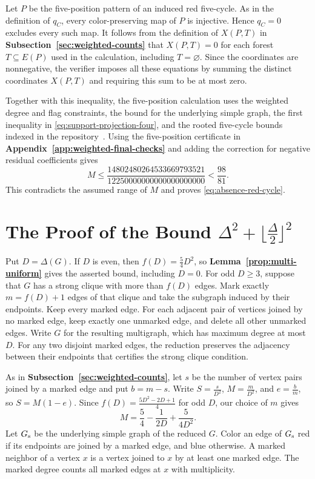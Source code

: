 \documentclass[preprint,11pt,numbers]{elsarticle-arxiv}
\numberwithin{equation}{section}
\theoremstyle{definition}
\begin{document}
Let $P$ be the five-position pattern of an induced red five-cycle.
As in the definition of $q_C$, every color-preserving map of $P$ is injective. Hence $q_C=0$ excludes every such map. It follows from
the definition of $X(P,T)$ in
\textbf{Subsection~\ref{sec:weighted-counts}} that $X(P,T)=0$ for
each forest $T\subseteq E(P)$ used in the calculation, including
$T=\varnothing$. Since the coordinates are nonnegative, the verifier
imposes all these equations by summing the distinct coordinates
$X(P,T)$ and requiring this sum to be at most zero.

Together with this inequality, the five-position calculation uses
the weighted degree and flag constraints, the bound for the underlying simple graph,
the first inequality in \eqref{eq:support-projection-four}, and the
rooted five-cycle bounds indexed in the repository~\cite{FGSTCode}.
Using the five-position certificate in
\textbf{Appendix~\ref{app:weighted-final-checks}} and adding the correction for
negative residual coefficients gives
\[
 M\leq\frac{14802480264533669793521}{12250000000000000000000}
   <\frac{98}{81}.
\]
This contradicts the assumed range of $M$ and proves
\eqref{eq:absence-red-cycle}.
\relax\space%
\relax\space%
\section{The Proof of the Bound \texorpdfstring{$\Delta^2+\lfloor\frac{\Delta}{2}\rfloor^2$}{Delta squared plus floor(Delta/2) squared}}\label{sec:exact}\label{sec:multi-odd}

Put $D=\Delta(G)$. If $D$ is even, then $f(D)=\frac{5}{4}D^2$, so
\textbf{Lemma~\ref{prop:multi-uniform}} gives the asserted bound,
including $D=0$. For odd $D\geq3$, suppose that $G$ has a strong
clique with more than $f(D)$ edges. Mark exactly $m=f(D)+1$ edges of
that clique and take the subgraph induced by their endpoints. Keep
every marked edge. For each adjacent pair of vertices joined by no
marked edge, keep exactly one unmarked edge, and delete all other
unmarked edges. Write $G$ for the resulting multigraph, which has
maximum degree at most $D$. For any two disjoint marked edges, the
reduction preserves the adjacency between their endpoints that
certifies the strong clique condition.

As in \textbf{Subsection~\ref{sec:weighted-counts}}, let $s$ be the
number of vertex pairs joined by a marked edge and put $b=m-s$. Write
$S=\frac{s}{D^2}$, $M=\frac{m}{D^2}$, and $e=\frac{b}{m}$, so
$S=M(1-e)$. Since $f(D)=\frac{5D^2-2D+1}{4}$ for odd $D$, our
choice of $m$ gives
\begin{equation}\label{eq:multi-mass}
 M=\frac{5}{4}-\frac{1}{2D}+\frac{5}{4D^2}.
\end{equation}
Let $G_{\rm s}$ be the underlying simple graph of the reduced $G$.
Color an edge of $G_{\rm s}$ red if its endpoints are joined by a
marked edge, and blue otherwise. A marked neighbor of a vertex
$x$ is a vertex joined to $x$ by at least one marked edge. The
marked degree counts all marked edges at $x$ with multiplicity.
\end{document}

